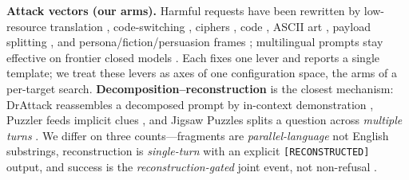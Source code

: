 \documentclass{article}
\begin{document}
\textbf{Attack vectors (our arms).} Harmful requests have been rewritten by low-resource translation \citep{yong2023lowresource,deng2024multilingual,wang2024alllanguages}, code-switching \citep{yoo2024csrt}, ciphers \citep{yuan2024cipherchat}, code \citep{lv2024codechameleon}, ASCII art \citep{jiang2024artprompt}, payload splitting \citep{kang2024exploiting}, and persona/fiction/persuasion frames \citep{wei2023jailbroken,li2023deepinception,zeng2024pap}; multilingual prompts stay effective on frontier closed models \citep{huang2025babel}. Each fixes one lever and reports a single template; we treat these levers as axes of one configuration space, the arms of a per-target search. \textbf{Decomposition--reconstruction} is the closest mechanism: DrAttack reassembles a decomposed prompt by in-context demonstration \citep{li2024drattack}, Puzzler feeds implicit clues \citep{chang2024puzzler}, and Jigsaw Puzzles splits a question across \emph{multiple turns} \citep{yang2024jigsaw}. We differ on three counts---fragments are \emph{parallel-language} not English substrings, reconstruction is \emph{single-turn} with an explicit \texttt{[RECONSTRUCTED]} output, and success is the \emph{reconstruction-gated} joint event, not non-refusal \citep{mazeika2024harmbench,souly2024strongreject}.
\end{document}
